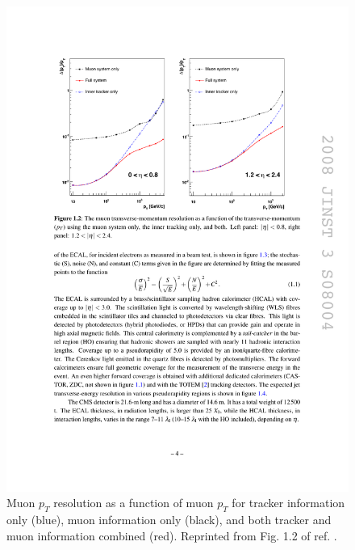 \documentclass[dissertation.tex]{subfiles}
\begin{document}
\begin{figure}
	\centering
	\includegraphics[scale=1.0]{muon_pT_res}
	\caption{Muon $p_{T}$ resolution as a function of muon $p_{T}$ for tracker information only (blue), muon information only (black), and both tracker and muon information combined (red).  Reprinted from Fig. 1.2 of ref. \cite{CMS_detector_paper}.}
	\label{fig:muon_pT_res}
\end{figure}
\end{document}
